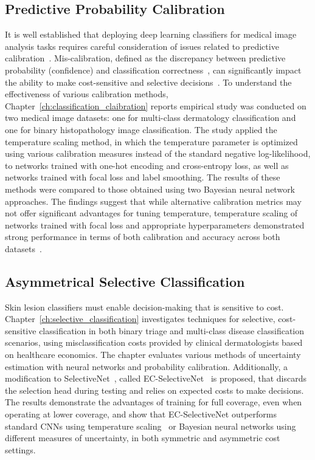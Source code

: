 \subsection*{Predictive Probability Calibration}
It is well established that deploying deep learning classifiers for medical image analysis tasks requires careful consideration of issues related to predictive calibration~\citep{maron2019systematic}. Mis-calibration, defined as the discrepancy between predictive probability (confidence) and classification correctness~\citep{guo2017calibration}, can significantly impact the ability to make cost-sensitive and selective decisions~\citep{carse2021robust}. To understand the effectiveness of various calibration methods, Chapter~\ref{ch:classification_claibration} reports empirical study was conducted on two medical image datasets: one for multi-class dermatology classification and one for binary histopathology image classification. The study applied the temperature scaling method, in which the temperature parameter is optimized using various calibration measures instead of the standard negative log-likelihood, to networks trained with one-hot encoding and cross-entropy loss, as well as networks trained with focal loss and label smoothing. The results of these methods were compared to those obtained using two Bayesian neural network approaches. The findings suggest that while alternative calibration metrics may not offer significant advantages for tuning temperature, temperature scaling of networks trained with focal loss and appropriate hyperparameters demonstrated strong performance in terms of both calibration and accuracy across both datasets~\citep{carse2022calibration}.

\subsection*{Asymmetrical Selective Classification}
Skin lesion classifiers must enable decision-making that is sensitive to cost. Chapter~\ref{ch:selective_classification} investigates techniques for selective, cost-sensitive classification in both binary triage and multi-class disease classification scenarios, using misclassification costs provided by clinical dermatologists based on healthcare economics. The chapter evaluates various methods of uncertainty estimation with neural networks and probability calibration. Additionally, a modification to SelectiveNet~\citep{geifman2019selectivenet}, called EC-SelectiveNet~\citep{carse2021robust} is proposed, that discards the selection head during testing and relies on expected costs to make decisions. The results demonstrate the advantages of training for full coverage, even when operating at lower coverage, and show that EC-SelectiveNet outperforms standard CNNs using temperature scaling~\citep{guo2017calibration} or Bayesian neural networks using different measures of uncertainty, in both symmetric and asymmetric cost settings.

